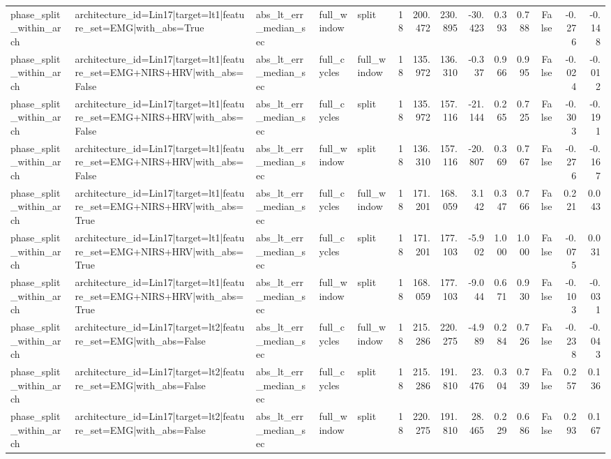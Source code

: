 \begin{table}
\begin{tabular}{lllllrrrrrrrrr}
phase_split_within_arch & architecture_id=Lin17|target=lt1|feature_set=EMG|with_abs=True & abs_lt_err_median_sec & full_window & split & 18 & 200.472 & 230.895 & -30.423 & 0.393 & 0.788 & False & -0.276 & -0.148 \\
phase_split_within_arch & architecture_id=Lin17|target=lt1|feature_set=EMG+NIRS+HRV|with_abs=False & abs_lt_err_median_sec & full_cycles & full_window & 18 & 135.972 & 136.310 & -0.337 & 0.966 & 0.995 & False & -0.024 & -0.012 \\
phase_split_within_arch & architecture_id=Lin17|target=lt1|feature_set=EMG+NIRS+HRV|with_abs=False & abs_lt_err_median_sec & full_cycles & split & 18 & 135.972 & 157.116 & -21.144 & 0.265 & 0.725 & False & -0.303 & -0.191 \\
phase_split_within_arch & architecture_id=Lin17|target=lt1|feature_set=EMG+NIRS+HRV|with_abs=False & abs_lt_err_median_sec & full_window & split & 18 & 136.310 & 157.116 & -20.807 & 0.369 & 0.767 & False & -0.276 & -0.167 \\
phase_split_within_arch & architecture_id=Lin17|target=lt1|feature_set=EMG+NIRS+HRV|with_abs=True & abs_lt_err_median_sec & full_cycles & full_window & 18 & 171.201 & 168.059 & 3.142 & 0.347 & 0.766 & False & 0.221 & 0.043 \\
phase_split_within_arch & architecture_id=Lin17|target=lt1|feature_set=EMG+NIRS+HRV|with_abs=True & abs_lt_err_median_sec & full_cycles & split & 18 & 171.201 & 177.103 & -5.902 & 1.000 & 1.000 & False & -0.075 & 0.031 \\
phase_split_within_arch & architecture_id=Lin17|target=lt1|feature_set=EMG+NIRS+HRV|with_abs=True & abs_lt_err_median_sec & full_window & split & 18 & 168.059 & 177.103 & -9.044 & 0.671 & 0.930 & False & -0.103 & -0.031 \\
phase_split_within_arch & architecture_id=Lin17|target=lt2|feature_set=EMG|with_abs=False & abs_lt_err_median_sec & full_cycles & full_window & 18 & 215.286 & 220.275 & -4.989 & 0.284 & 0.726 & False & -0.238 & -0.043 \\
phase_split_within_arch & architecture_id=Lin17|target=lt2|feature_set=EMG|with_abs=False & abs_lt_err_median_sec & full_cycles & split & 18 & 215.286 & 191.810 & 23.476 & 0.304 & 0.739 & False & 0.257 & 0.136 \\
phase_split_within_arch & architecture_id=Lin17|target=lt2|feature_set=EMG|with_abs=False & abs_lt_err_median_sec & full_window & split & 18 & 220.275 & 191.810 & 28.465 & 0.229 & 0.686 & False & 0.293 & 0.167 \\

\end{tabular}
\end{table}
